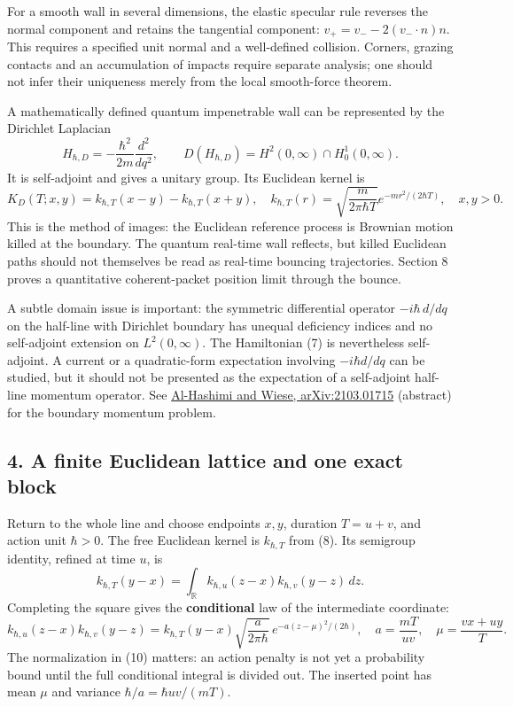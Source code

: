 \documentclass[11pt,a4paper]{article}
\begin{document}
For a smooth wall in several dimensions, the elastic specular rule
reverses the normal component and retains the tangential component:
\(v_+=v_--2(v_-\cdot n)n\). This requires a specified unit normal and a
well-defined collision. Corners, grazing contacts and an accumulation of
impacts require separate analysis; one should not infer their uniqueness
merely from the local smooth-force theorem.

A mathematically defined quantum impenetrable wall can be represented by
the Dirichlet Laplacian
\[H_{\hbar,D}=-\frac{\hbar^2}{2m}\frac{d^2}{dq^2},
\qquad D(H_{\hbar,D})=H^2(0,\infty)\cap H^1_0(0,\infty).\tag{7}\] It is
self-adjoint and gives a unitary group. Its Euclidean kernel is \[
 K_D(T;x,y)=k_{\hbar,T}(x-y)-k_{\hbar,T}(x+y),
 \quad
 k_{\hbar,T}(r)=\sqrt{\frac m{2\pi\hbar T}}
             e^{-mr^2/(2\hbar T)},\quad x,y>0.\tag{8}
\] This is the method of images: the Euclidean reference process is
Brownian motion killed at the boundary. The quantum real-time wall
reflects, but killed Euclidean paths should not themselves be read as
real-time bouncing trajectories. Section 8 proves a quantitative
coherent-packet position limit through the bounce.

A subtle domain issue is important: the symmetric differential operator
\(-i\hbar\,d/dq\) on the half-line with Dirichlet boundary has unequal
deficiency indices and no self-adjoint extension on \(L^2(0,\infty)\).
The Hamiltonian (7) is nevertheless self-adjoint. A current or a
quadratic-form expectation involving \(-i\hbar d/dq\) can be studied,
but it should not be presented as the expectation of a self-adjoint
half-line momentum operator. See
\href{https://arxiv.org/abs/2103.01715}{Al-Hashimi and Wiese,
arXiv:2103.01715} (abstract) for the boundary momentum problem.

\hypertarget{a-finite-euclidean-lattice-and-one-exact-block}{%
\subsection{4. A finite Euclidean lattice and one exact
block}\label{a-finite-euclidean-lattice-and-one-exact-block}}

Return to the whole line and choose endpoints \(x,y\), duration
\(T=u+v\), and action unit \(\hbar>0\). The free Euclidean kernel is
\(k_{\hbar,T}\) from (8). Its semigroup identity, refined at time \(u\),
is \[k_{\hbar,T}(y-x)=\int_{\mathbb R}
       k_{\hbar,u}(z-x)k_{\hbar,v}(y-z)\,dz.\tag{9}\] Completing the
square gives the \textbf{conditional} law of the intermediate
coordinate: \[
 k_{\hbar,u}(z-x)k_{\hbar,v}(y-z)
 =k_{\hbar,T}(y-x)\sqrt{\frac a{2\pi\hbar}}\,
   e^{-a(z-\mu)^2/(2\hbar)},\quad
 a=\frac{mT}{uv},\quad\mu=\frac{vx+uy}{T}. \tag{10}
\] The normalization in (10) matters: an action penalty is not yet a
probability bound until the full conditional integral is divided out.
The inserted point has mean \(\mu\) and variance
\(\hbar/a=\hbar uv/(mT)\).
\end{document}
